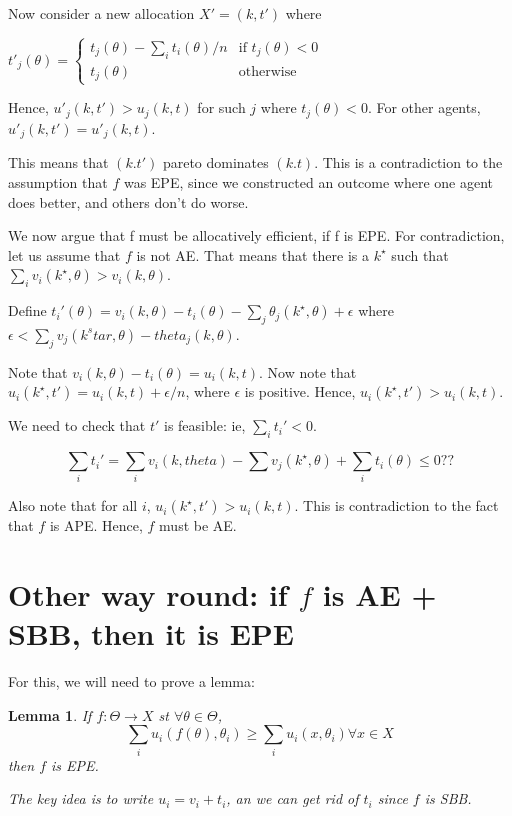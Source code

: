 \documentclass[10pt,a4paper]{article}
\newtheorem{lemma}{Lemma}
\begin{document}
Now consider a new allocation $X' = (k, t')$ where 

$t'_j(\theta) = 
\begin{cases}
    t_j(\theta) -  \sum_i t_i(\theta)/n & \text{if $t_j(\theta) < 0$} \\
    t_j(\theta) & \text{otherwise}
\end{cases}
$ 

Hence, $u'_j(k, t') > u_j(k, t)$ for such $j$ where $t_j(\theta) < 0$.
For other agents, $u'_j(k, t') = u'_j(k, t)$.

This means that $(k. t')$ pareto dominates $(k. t)$. This is a contradiction
to the assumption that $f$ was EPE, since we constructed an outcome where
one agent does better, and others don't do worse.

We now argue that f must be allocatively efficient, if  f is EPE. For contradiction,
let us assume that $f$ is not AE.
That means that there is a $k^\star$ such that
$\sum_i v_i(k^\star, \theta) > v_i (k, \theta)$.

Define $t_i'(\theta)  = v_i(k, \theta) - t_i (\theta) - \sum_j \theta_j(k^\star, \theta) + \epsilon$
where $\epsilon < \sum_j v_j(k^star, \theta) - theta_j (k, \theta)$.

Note that $v_i(k, \theta) - t_i (\theta)  = u_i(k, t)$. 
Now note that
$u_i(k^\star, t') = u_i(k, t) + \epsilon/n$, where $\epsilon$ is positive.
Hence, $u_i(k^\star, t') > u_i(k, t)$. 

We need to check that $t'$ is feasible: ie, $\sum_i t_i' < 0$.

$$
\sum_i t_i' = \sum_i v_i(k, theta) - \sum v_j(k^\star, \theta) + \sum_i t_i(\theta) \leq 0??
$$

Also note that for all $i$, $u_i(k^\star, t') > u_i(k, t)$. This is contradiction
to the fact that $f$ is APE. Hence, $f$ must be AE.

\section{Other way round: if $f$ is AE + SBB, then it is EPE}

For this, we will need to prove a lemma:

\begin{lemma}
If $f: \Theta \rightarrow X$ st $\forall \theta \in \Theta$,
$$
\sum_i u_i(f(\theta), \theta_i) \geq \sum_i u_i(x, \theta_i) \forall x \in X
$$
then $f$ is EPE.

The key idea is to write $u_i = v_i + t_i$, an we can get rid of $t_i$ since
$f$ is SBB.
\end{lemma}
\end{document}

